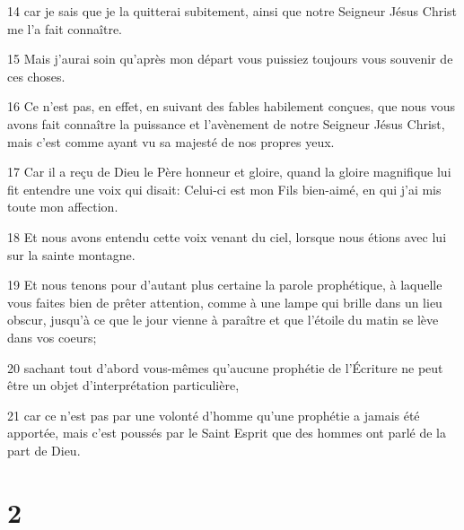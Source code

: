 \par 14 car je sais que je la quitterai subitement, ainsi que notre Seigneur Jésus Christ me l'a fait connaître.
\par 15 Mais j'aurai soin qu'après mon départ vous puissiez toujours vous souvenir de ces choses.
\par 16 Ce n'est pas, en effet, en suivant des fables habilement conçues, que nous vous avons fait connaître la puissance et l'avènement de notre Seigneur Jésus Christ, mais c'est comme ayant vu sa majesté de nos propres yeux.
\par 17 Car il a reçu de Dieu le Père honneur et gloire, quand la gloire magnifique lui fit entendre une voix qui disait: Celui-ci est mon Fils bien-aimé, en qui j'ai mis toute mon affection.
\par 18 Et nous avons entendu cette voix venant du ciel, lorsque nous étions avec lui sur la sainte montagne.
\par 19 Et nous tenons pour d'autant plus certaine la parole prophétique, à laquelle vous faites bien de prêter attention, comme à une lampe qui brille dans un lieu obscur, jusqu'à ce que le jour vienne à paraître et que l'étoile du matin se lève dans vos coeurs;
\par 20 sachant tout d'abord vous-mêmes qu'aucune prophétie de l'Écriture ne peut être un objet d'interprétation particulière,
\par 21 car ce n'est pas par une volonté d'homme qu'une prophétie a jamais été apportée, mais c'est poussés par le Saint Esprit que des hommes ont parlé de la part de Dieu.

\chapter{2}


